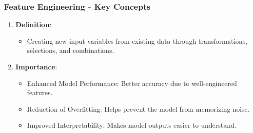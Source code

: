 \documentclass{beamer}
\begin{document}
\begin{frame}[fragile]
    \frametitle{Feature Engineering - Key Concepts}
    \begin{enumerate}
        \item \textbf{Definition}:
        \begin{itemize}
            \item Creating new input variables from existing data through transformations, selections, and combinations.
        \end{itemize}
        
        \item \textbf{Importance}:
        \begin{itemize}
            \item Enhanced Model Performance: Better accuracy due to well-engineered features.
            \item Reduction of Overfitting: Helps prevent the model from memorizing noise.
            \item Improved Interpretability: Makes model outputs easier to understand.
        \end{itemize}
    \end{enumerate}
\end{frame}
\end{document}
